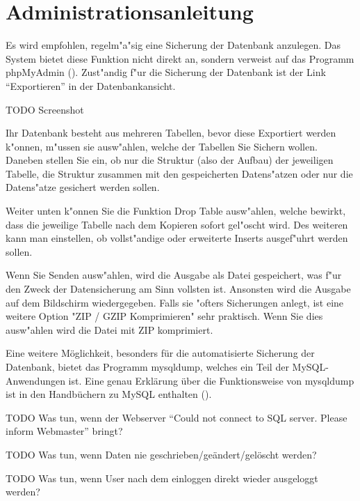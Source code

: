 \section{Administrationsanleitung}


Es wird empfohlen, regelm"a"sig eine Sicherung der Datenbank anzulegen. Das System bietet diese Funktion nicht direkt an,
sondern verweist auf das Programm phpMyAdmin (). Zust"andig f"ur die Sicherung der Datenbank ist der Link ``Exportieren'' in der Datenbankansicht.

{TODO Screenshot}

Ihr Datenbank besteht aus mehreren Tabellen, bevor diese Exportiert werden k"onnen, m"ussen sie ausw"ahlen, welche der Tabellen Sie Sichern wollen. 
Daneben stellen Sie ein, ob nur die Struktur 
(also der Aufbau) der jeweiligen Tabelle, die Struktur zusammen mit den gespeicherten Datens"atzen oder nur die Datens"atze gesichert werden sollen.

Weiter unten k"onnen Sie die Funktion Drop Table ausw"ahlen, welche bewirkt, dass die jeweilige Tabelle nach dem Kopieren sofort gel"oscht wird. Des weiteren 
kann man einstellen, ob vollst"andige oder erweiterte Inserts ausgef"uhrt werden sollen.  

Wenn Sie Senden ausw"ahlen, wird die Ausgabe als Datei gespeichert, was f"ur den Zweck der Datensicherung am Sinn vollsten ist. Ansonsten wird die 
Ausgabe auf dem Bildschirm wiedergegeben. 
Falls sie "ofters Sicherungen anlegt, ist eine weitere Option "ZIP / GZIP Komprimieren" sehr praktisch. Wenn Sie dies ausw"ahlen wird die Datei mit ZIP 
komprimiert.

Eine weitere Möglichkeit, besonders für die automatisierte Sicherung der Datenbank, bietet das Programm mysqldump, welches ein Teil der MySQL-Anwendungen ist. Eine genau Erklärung über die Funktionsweise von mysqldump ist in den Handbüchern zu MySQL enthalten ().

{TODO Was tun, wenn der Webserver ``Could not connect to SQL server. Please inform Webmaster'' bringt?}

{TODO Was tun, wenn Daten nie geschrieben/geändert/gelöscht werden?}

{TODO Was tun, wenn User nach dem einloggen direkt wieder ausgeloggt werden?}